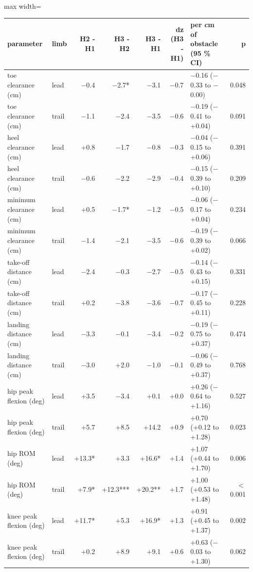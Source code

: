 \begin{adjustbox}{max width=\textwidth}
{\scriptsize
\begin{tabular}{llrrrrlr}
\toprule
\textbf{parameter} & \textbf{limb} & \textbf{H2 - H1} & \textbf{H3 - H2} & \textbf{H3 - H1} & \textbf{dz (H3 - H1)} & \textbf{per cm of obstacle (95 \% CI)} & \textbf{p} \\
\midrule
toe clearance (cm) & lead & $-$0.4 & $-$2.7* & $-$3.1 & $-$0.7 & $-$0.16 ($-$0.33 to $-$0.00) & 0.048 \\
toe clearance (cm) & trail & $-$1.1 & $-$2.4 & $-$3.5 & $-$0.6 & $-$0.19 ($-$0.41 to +0.04) & 0.091 \\
heel clearance (cm) & lead & +0.8 & $-$1.7 & $-$0.8 & $-$0.3 & $-$0.04 ($-$0.15 to +0.06) & 0.391 \\
heel clearance (cm) & trail & $-$0.6 & $-$2.2 & $-$2.9 & $-$0.4 & $-$0.15 ($-$0.39 to +0.10) & 0.209 \\
minimum clearance (cm) & lead & +0.5 & $-$1.7* & $-$1.2 & $-$0.5 & $-$0.06 ($-$0.17 to +0.04) & 0.234 \\
minimum clearance (cm) & trail & $-$1.4 & $-$2.1 & $-$3.5 & $-$0.6 & $-$0.19 ($-$0.39 to +0.02) & 0.066 \\
take-off distance (cm) & lead & $-$2.4 & $-$0.3 & $-$2.7 & $-$0.5 & $-$0.14 ($-$0.43 to +0.15) & 0.331 \\
take-off distance (cm) & trail & +0.2 & $-$3.8 & $-$3.6 & $-$0.7 & $-$0.17 ($-$0.45 to +0.11) & 0.228 \\
landing distance (cm) & lead & $-$3.3 & $-$0.1 & $-$3.4 & $-$0.2 & $-$0.19 ($-$0.75 to +0.37) & 0.474 \\
landing distance (cm) & trail & $-$3.0 & +2.0 & $-$1.0 & $-$0.1 & $-$0.06 ($-$0.49 to +0.37) & 0.768 \\
hip peak flexion (deg) & lead & +3.5 & $-$3.4 & +0.1 & +0.0 & +0.26 ($-$0.64 to +1.16) & 0.527 \\
hip peak flexion (deg) & trail & +5.7 & +8.5 & +14.2 & +0.9 & +0.70 (+0.12 to +1.28) & 0.023 \\
hip ROM (deg) & lead & +13.3* & +3.3 & +16.6* & +1.4 & +1.07 (+0.44 to +1.70) & 0.006 \\
hip ROM (deg) & trail & +7.9* & +12.3*** & +20.2** & +1.7 & +1.00 (+0.53 to +1.48) & $<$0.001 \\
knee peak flexion (deg) & lead & +11.7* & +5.3 & +16.9* & +1.3 & +0.91 (+0.45 to +1.37) & 0.002 \\
knee peak flexion (deg) & trail & +0.2 & +8.9 & +9.1 & +0.6 & +0.63 ($-$0.03 to +1.30) & 0.062 \\

\end{tabular}}
\end{adjustbox}
